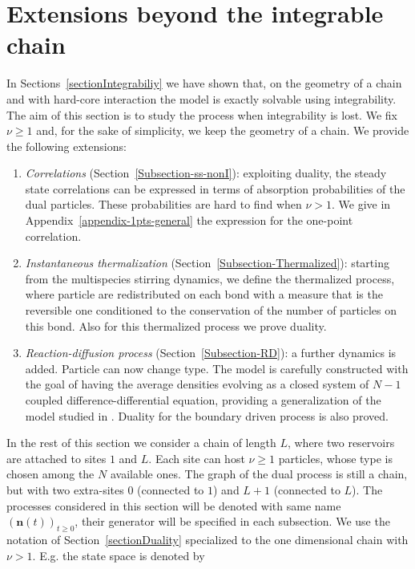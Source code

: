 \documentclass[10pt]{article}
\numberwithin{equation}{section}
\numberwithin{equation}{subsection}
\begin{document}
\section{Extensions beyond the integrable chain}
\label{sec5}
In Sections~\ref{sectionIntegrabiliy} we have shown that, on the geometry of a chain and with hard-core interaction the model is exactly solvable using integrability.  
The aim of this section is to study the process when integrability is lost. We fix $\nu\geq 1$ and, for the sake of simplicity, we keep the geometry of a chain. We provide the following extensions: 
\begin{enumerate}
	\item \textit{Correlations} (Section~\ref{Subsection-ss-nonI}): exploiting duality, the steady state correlations can be expressed in terms of absorption probabilities of the dual particles. These probabilities are hard to find when $\nu>1$. We give 
	in Appendix~\ref{appendix-1pts-general} the expression for the one-point correlation.
	\item \textit{Instantaneous thermalization} (Section~\ref{Subsection-Thermalized}): starting from the multispecies stirring dynamics, we define the thermalized process, where particle are redistributed on each bond with a measure that is the reversible one conditioned to the conservation of the number of particles on this bond. Also for this thermalized process we prove duality. 	
	\item \textit{Reaction-diffusion process} (Section~\ref{Subsection-RD}): a further dynamics is added. Particle can now change type. The model is carefully constructed with the goal of having the average densities evolving as a closed system of $N-1$ coupled difference-differential equation, providing a generalization of the model studied in \cite{casini2022uphill}. Duality for the boundary driven process is also proved.
\end{enumerate}
In the rest of this section we consider a chain of length $L$, where two reservoirs are attached to sites $1$ and $L$. Each site can host $\nu\geq 1$ particles, whose type is chosen among the $N$ available ones. The graph of the dual process is still a chain, but with two extra-sites $0$ (connected to $1$) and $L+1$ (connected to $L$). The processes considered in this section will be denoted with same name $\left(\bm{n}(t)\right)_{t\geq0}$, their generator will be specified in each subsection. 
We use the notation of Section~\ref{sectionDuality} specialized to the one dimensional chain with $\nu >1$.
E.g. the state space is denoted by 
\end{document}
